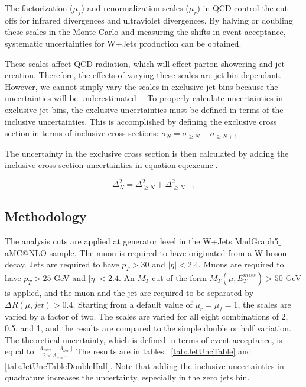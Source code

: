 \documentclass[oneside, letterpaper, oldfontcommands]{memoir}
\begin{document}
\begin{table}
\qquad The factorization ($\mu_{f}$) and renormalization scales ($\mu_{r}$) in QCD control the cut-offs for infrared divergences and ultraviolet divergences. By halving or doubling these scales in the Monte Carlo and measuring the shifts in event acceptance, systematic uncertainties for W+Jets production can be obtained.

\qquad These scales affect QCD radiation, which will effect parton showering and jet creation. Therefore, the effects of varying these scales are jet bin dependant. However, we cannot simply vary the scales in exclusive jet bins because the uncertainties will be underestimated~\cite{Gangal:2013nxa}~\cite{Stewart:2011cf} To properly calculate uncertainties in exclusive jet bins, the exclusive uncertainties must be defined in terms of the inclusive uncertainties.
This is accomplished by defining the exclusive cross section in terms of inclusive cross sections: $\sigma_{N} = \sigma_{\geq N} - \sigma_{\geq N+1}$

\qquad The uncertainty in the exclusive cross section is then calculated by adding the inclusive cross section uncertainties in equation\eqref{eq:excunc}.

\begin{equation}\label{eq:excunc}
\Delta_{N}^2 = \Delta_{\geq N}^2 + \Delta_{\geq N+1}^2
\end{equation}

\subsection{Methodology}
\label{application}

\qquad The analysis cuts are applied at generator level in the W+Jets {\sc MadGraph5$\_$aMC@NLO} sample. The muon is required to have originated from a W boson decay. Jets are required to have $p_{T} > 30$ and $|\eta| < 2.4$. Muons are required to have $p_{T} > 25$ GeV and $|\eta| < 2.4$. An $M_{T}$ cut of the form $M_{T}(\mu,E_{T}^{miss}) > 50$ GeV is applied, and the muon and the jet are required to be separated by $\Delta R(\mu,jet) > 0.4$. Starting from a default value of $\mu_{r} = \mu_{f} = 1$, the scales are varied by a factor of two. The scales are varied for all eight combinations of 2, 0.5, and 1, and the results are compared to the simple double or half variation.  The theoretical uncertainty, which is defined in terms of event acceptance, is equal to $\frac{|A_{max} - A_{min}|}{2 \times A_{\mu=1}}$  The results are in tables ~\ref{tab:JetUncTable} and \ref{tab:JetUncTableDoubleHalf}. Note that adding the inclusive uncertainties in quadrature increases the uncertainty, especially in the zero jets bin.


\end{table}
\end{document}
